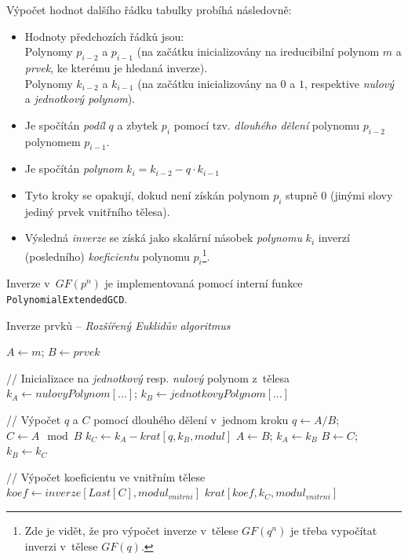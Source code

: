 \documentclass[thesis=M,czech,hidelinks]{FITthesis}[2012/06/26]
\newcommand{\0}{{\textcolor[gray]{0.80}{0}}}
\newenvironment{algoritmus}{
    \floatname{algorithm}{Algoritmus}
    \begin{algorithm}
}{\end{algorithm}}
\begin{document}
Výpočet hodnot dalšího řádku tabulky probíhá následovně:
\begin{itemize}
    \item Hodnoty předchozích řádků jsou:\\
        \hspace*{0.6cm}Polynomy $p_{i-2}$ a $p_{i-1}$ (na začátku inicializovány
            na ireducibilní polynom $m$ a \emph{prvek}, ke kterému je hledaná
            inverze). \\
        \hspace*{0.6cm}Polynomy $k_{i-2}$ a $k_{i-1}$ (na začátku inicializovány
            na $0$ a $1$, respektive \emph{nulový} a \emph{jednotkový
            polynom}).

    \item Je spočítán \emph{podíl} $q$ a zbytek $p_i$ pomocí tzv. \emph{dlouhého
        dělení} polynomu $p_{i-2}$ polynomem $p_{i-1}$.

    \item Je spočítán \emph{polynom} $k_i = k_{i-2} - q \cdot k_{i-1} $

    \item Tyto kroky se opakují, dokud není získán polynom $p_i$ stupně $0$
        (jinými slovy jediný prvek vnitřního tělesa).

    \item Výsledná \emph{inverze} se získá jako skalární násobek \emph{polynomu}
        $k_i$ inverzí (posledního) \emph{koeficientu} polynomu $p_i$\footnote{
            Zde je vidět, že pro výpočet inverze v~tělese $GF(q^n)$ je třeba
            vypočítat inverzi v~tělese $GF(q)$.
        }.
\end{itemize}

Inverze v~$GF(p^n)$ je implementovaná pomocí interní funkce
\texttt{Polynomial\-ExtendedGCD}.

\begin{algoritmus}[!ht]
    \caption{Inverze prvků -- \emph{Rozšířený Euklidův algoritmus}}
    \begin{algorithmic}[1]
        \State $ A \gets m $; $ B \gets prvek $

        // Inicializace na \emph{jednotkový} resp. \emph{nulový} polynom z~tělesa
        \State $ k_A \gets nulovyPolynom[\ldots] $;
            $ k_B \gets jednotkovyPolynom[\ldots] $

            // Výpočet $q$ a $C$ pomocí dlouhého dělení v~jednom kroku
            \State $ q   \gets A/B $; $ C   \gets A \mod B $
            \State $ k_C \gets k_A - krat[ q, k_B, modul ] $
            \State $ A \gets B$; $k_A \gets k_B$
            \State $ B \gets C$; $k_B \gets k_C$
        \EndWhile

        // Výpočet koeficientu ve vnitřním tělese
        \State $koef \gets inverze[ Last[C], modul_{vnitrni} ]$
        \State \Return $krat[ koef, k_C, modul_{vnitrni} ]$
     \EndFunction
    \end{algorithmic}
    \label{alg_eea}
\end{algoritmus}
\end{document}
